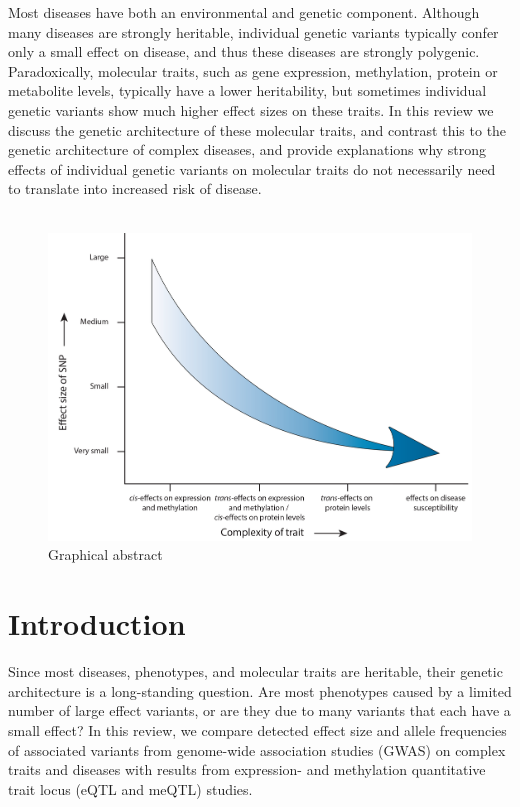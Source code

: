 Most diseases have both an environmental and genetic component. Although many diseases are strongly heritable, individual genetic variants typically confer only a small effect on disease, and thus these diseases are strongly polygenic. Paradoxically, molecular traits, such as gene expression, methylation, protein or metabolite levels, typically have a lower heritability, but sometimes individual genetic variants show much higher effect sizes on these traits. In this review we discuss the genetic architecture of these molecular traits, and contrast this to the genetic architecture of complex diseases, and provide explanations why strong effects of individual genetic variants on molecular traits do not necessarily need to translate into increased risk of disease.
\\
\\
\begin{figure}[h!]
\includegraphics[scale=0.1]{chapters/chapter2-genetic-architecture/img/AbstractFigureCorrectSizeWhite}
\caption{Graphical abstract}
\end{figure}


\section{Introduction}

Since most diseases, phenotypes, and molecular traits are heritable, their genetic architecture is a long-standing question. Are most phenotypes caused by a limited number of large effect variants, or are they due to many variants that each have a small effect? In this review, we compare detected effect size and allele frequencies of associated variants from genome-wide association studies (GWAS) on complex traits and diseases with results from expression- and methylation quantitative trait locus (eQTL and meQTL) studies.

